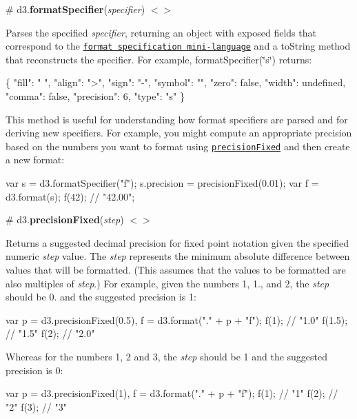 \label{_formatSpecifier}%
\# d3.{\bfseries format\+Specifier}({\itshape specifier}) \href{https://github.com/d3/d3-format/blob/master/src/formatSpecifier.js}{\tt $<$$>$}

Parses the specified {\itshape specifier}, returning an object with exposed fields that correspond to the \href{#locale_format}{\tt format specification mini-\/language} and a to\+String method that reconstructs the specifier. For example, {\ttfamily format\+Specifier(\char`\"{}s\char`\"{})} returns\+:


\begin{DoxyCode}
\{
  "fill": " ",
  "align": ">",
  "sign": "-",
  "symbol": "",
  "zero": false,
  "width": undefined,
  "comma": false,
  "precision": 6,
  "type": "s"
\}
\end{DoxyCode}


This method is useful for understanding how format specifiers are parsed and for deriving new specifiers. For example, you might compute an appropriate precision based on the numbers you want to format using \href{#precisionFixed}{\tt precision\+Fixed} and then create a new format\+:


\begin{DoxyCode}
var s = d3.formatSpecifier("f");
s.precision = precisionFixed(0.01);
var f = d3.format(s);
f(42); // "42.00";
\end{DoxyCode}


\label{_precisionFixed}%
\# d3.{\bfseries precision\+Fixed}({\itshape step}) \href{https://github.com/d3/d3-format/blob/master/src/precisionFixed.js}{\tt $<$$>$}

Returns a suggested decimal precision for fixed point notation given the specified numeric {\itshape step} value. The {\itshape step} represents the minimum absolute difference between values that will be formatted. (This assumes that the values to be formatted are also multiples of {\itshape step}.) For example, given the numbers 1, 1., and 2, the {\itshape step} should be 0. and the suggested precision is 1\+:


\begin{DoxyCode}
var p = d3.precisionFixed(0.5),
    f = d3.format("." + p + "f");
f(1);   // "1.0"
f(1.5); // "1.5"
f(2);   // "2.0"
\end{DoxyCode}


Whereas for the numbers 1, 2 and 3, the {\itshape step} should be 1 and the suggested precision is 0\+:


\begin{DoxyCode}
var p = d3.precisionFixed(1),
    f = d3.format("." + p + "f");
f(1); // "1"
f(2); // "2"
f(3); // "3"
\end{DoxyCode}


